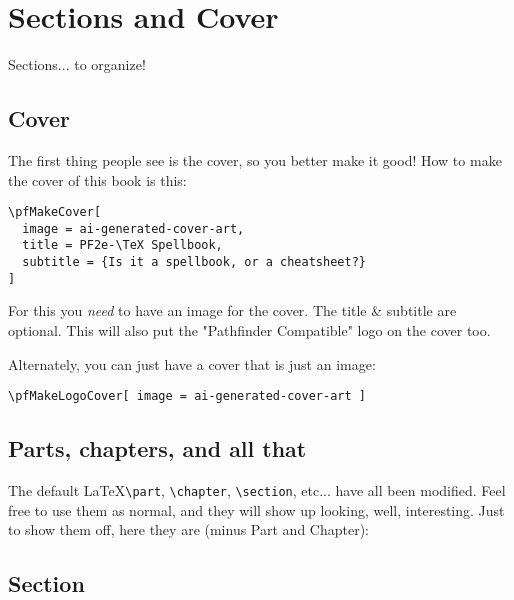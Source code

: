 \chapter{Sections and Cover}

Sections... to organize!

\begin{multicols}{2}

\section{Cover}

The first thing people see is the cover, so you better make it good!
How to make the cover of this book is this:

\begin{verbatim}
\pfMakeCover[
  image = ai-generated-cover-art,
  title = PF2e-\TeX Spellbook,
  subtitle = {Is it a spellbook, or a cheatsheet?}
]
\end{verbatim}

For this you \emph{need} to have an image for the cover.
The title \& subtitle are optional.
This will also put the "Pathfinder Compatible" logo on the cover too.

Alternately, you can just have a cover that is just an image:

\begin{verbatim}
\pfMakeLogoCover[ image = ai-generated-cover-art ]
\end{verbatim}

\section{Parts, chapters, and all that}

The default \LaTeX \verb+\part+, \verb+\chapter+, \verb+\section+, etc... have all been modified.
Feel free to use them as normal, and they will show up looking, well, interesting.
Just to show them off, here they are (minus Part and Chapter):

\section{Section}


\end{multicols}
